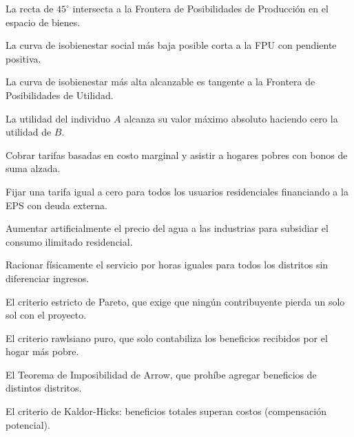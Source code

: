 \begin{opts}
    \item La recta de $45^\circ$ intersecta a la Frontera de Posibilidades de Producción en el espacio de bienes.
    \item La curva de isobienestar social más baja posible corta a la FPU con pendiente positiva.
    \item La curva de isobienestar más alta alcanzable es tangente a la Frontera de Posibilidades de Utilidad.
    \item La utilidad del individuo $A$ alcanza su valor máximo absoluto haciendo cero la utilidad de $B$.
\end{opts}

\begin{opts}
    \item Cobrar tarifas basadas en costo marginal y asistir a hogares pobres con bonos de suma alzada.
    \item Fijar una tarifa igual a cero para todos los usuarios residenciales financiando a la EPS con deuda externa.
    \item Aumentar artificialmente el precio del agua a las industrias para subsidiar el consumo ilimitado residencial.
    \item Racionar físicamente el servicio por horas iguales para todos los distritos sin diferenciar ingresos.
\end{opts}

\begin{opts}
    \item El criterio estricto de Pareto, que exige que ningún contribuyente pierda un solo sol con el proyecto.
    \item El criterio rawlsiano puro, que solo contabiliza los beneficios recibidos por el hogar más pobre.
    \item El Teorema de Imposibilidad de Arrow, que prohíbe agregar beneficios de distintos distritos.
    \item El criterio de Kaldor-Hicks: beneficios totales superan costos (compensación potencial).
\end{opts}

